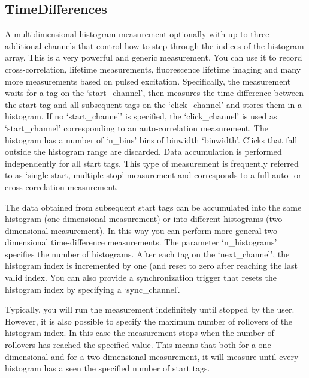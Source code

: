 \documentclass[letterpaper,10pt,english]{sphinxmanual}
\begin{document}
\subsection{TimeDifferences}
\label{sections/api:timedifferences}
A multidimensional histogram measurement optionally with up to three additional channels that control how to
step through the indices of the histogram array. This is a very powerful and generic measurement.
You can use it to record cross-correlation, lifetime measurements, fluorescence lifetime imaging
and many more measurements based on pulsed excitation.
Specifically, the measurement waits for a tag on the `start\_channel', then measures the
time difference between the start tag and all subsequent tags on the `click\_channel'
and stores them in a histogram. If no `start\_channel' is specified, the `click\_channel' is used as `start\_channel'
corresponding to an auto-correlation measurement.
The histogram has a number of `n\_bins' bins of binwidth `binwidth'. Clicks that fall outside the histogram range are discarded.
Data accumulation is performed independently for all start tags. This type of measurement is frequently referred to as
`single start, multiple stop' measurement and corresponds to a full auto- or cross-correlation measurement.

The data obtained from subsequent start tags can be accumulated into the same histogram (one-dimensional measurement)
or into different histograms (two-dimensional measurement). In this way you can perform more general two-dimensional
time-difference measurements. The parameter `n\_histograms' specifies the number of histograms. After each tag
on the `next\_channel', the histogram index is incremented by one (and reset to zero after reaching the last valid index.
You can also provide a synchronization trigger that resets the histogram index by
specifying a `sync\_channel'.

Typically, you will run the measurement indefinitely until stopped by the user. However, it is also possible to
specify the maximum number of rollovers of the histogram index. In this case the measurement stops when the number of
rollovers has reached the specified value. This means that both for a one-dimensional and for a
two-dimensional measurement, it will measure until every histogram has a seen the specified number of start tags.
\end{document}
